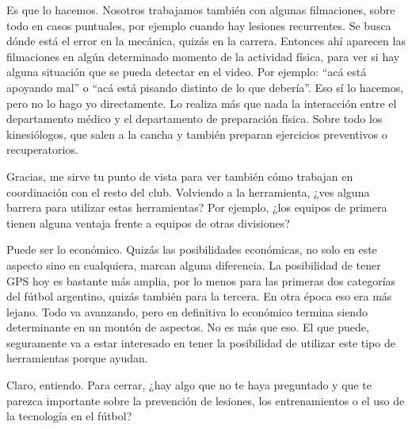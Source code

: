\begin{description}[leftmargin=0pt, itemindent=\parindent, labelsep=0.5em, itemsep=0pt, parsep=0pt, topsep=0pt]
    \item[\textbf{Leonardo Lemos:}] Es que lo hacemos. Nosotros trabajamos también con algunas filmaciones, sobre todo en casos puntuales, por ejemplo cuando hay lesiones recurrentes. Se busca dónde está el error en la mecánica, quizás en la carrera. Entonces ahí aparecen las filmaciones en algún determinado momento de la actividad física, para ver si hay alguna situación que se pueda detectar en el video. Por ejemplo: ``acá está apoyando mal'' o ``acá está pisando distinto de lo que debería''. Eso sí lo hacemos, pero no lo hago yo directamente. Lo realiza más que nada la interacción entre el departamento médico y el departamento de preparación física. Sobre todo los kinesiólogos, que salen a la cancha y también preparan ejercicios preventivos o recuperatorios.

    \item[\textbf{Entrevistador:}] Gracias, me sirve tu punto de vista para ver también cómo trabajan en coordinación con el resto del club. Volviendo a la herramienta, ¿ves alguna barrera para utilizar estas herramientas? Por ejemplo, ¿los equipos de primera tienen alguna ventaja frente a equipos de otras divisiones?

    \item[\textbf{Leonardo Lemos:}] Puede ser lo económico. Quizás las posibilidades económicas, no solo en este aspecto sino en cualquiera, marcan alguna diferencia. La posibilidad de tener GPS hoy es bastante más amplia, por lo menos para las primeras dos categorías del fútbol argentino, quizás también para la tercera. En otra época eso era más lejano. Todo va avanzando, pero en definitiva lo económico termina siendo determinante en un montón de aspectos. No es más que eso. El que puede, seguramente va a estar interesado en tener la posibilidad de utilizar este tipo de herramientas porque ayudan.

    \item[\textbf{Entrevistador:}] Claro, entiendo. Para cerrar, ¿hay algo que no te haya preguntado y que te parezca importante sobre la prevención de lesiones, los entrenamientos o el uso de la tecnología en el fútbol?


\end{description}
